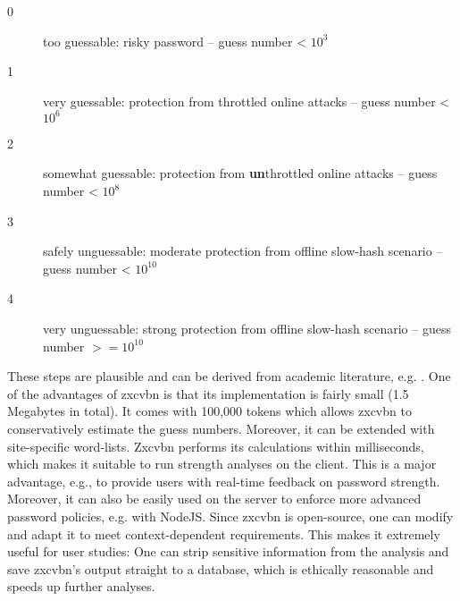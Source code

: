 	\begin{description}
		\item[0] too guessable: risky password -- guess number < $10^3$
		\item[1] very guessable: protection from throttled online attacks -- guess number < $10^6$
		\item[2] somewhat guessable: protection from \textbf{un}throttled online attacks -- guess number < $10^8$
		\item[3] safely unguessable: moderate protection from offline slow-hash scenario -- guess number < $10^{10}$
		\item[4] very unguessable: strong protection from offline slow-hash scenario -- guess number $>=10^{10}$
	\end{description} 

	These steps are plausible and can be derived from academic literature, e.g. \cite{Bonneau2012ScienceOfGuessing, Florencio2014AdministratorsGuide, Ur2015MeasuringRealWorldAccuracies, Wang2016fuzzyPWM}. 	
	One of the advantages of zxcvbn is that its implementation is fairly small (1.5 Megabytes in total). It comes with 100,000 tokens which allows zxcvbn to conservatively estimate the guess numbers. Moreover, it can be extended with site-specific word-lists. Zxcvbn performs its calculations within milliseconds, which makes it suitable to run strength analyses on the client. This is a major advantage, e.g., to provide users with real-time feedback on password strength. Moreover, it can also be easily used on the server to enforce more advanced password policies, e.g. with NodeJS. Since zxcvbn is open-source, one can modify and adapt it to meet context-dependent requirements. This makes it extremely useful for user studies: One can strip sensitive information from the analysis and save zxcvbn's output straight to a database, which is ethically reasonable and speeds up further analyses. 


